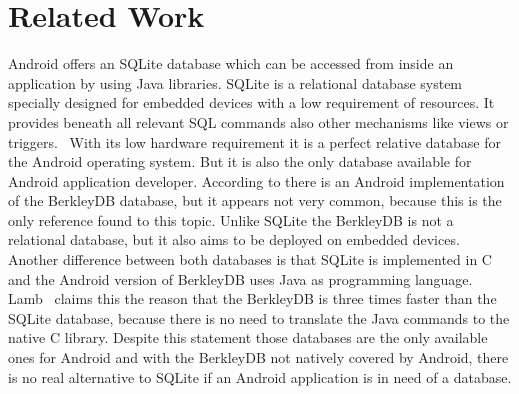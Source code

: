 \section{Related Work}
\label{sec:overview:related-work}
Android offers an SQLite database which can be accessed from inside an application by using Java libraries.
SQLite is a relational database system specially designed for embedded devices with a low requirement of resources.
It provides beneath all relevant SQL commands also other mechanisms like views or triggers.~\cite{owens2006definitive}
With its low hardware requirement it is a perfect relative database for the Android operating system.
But it is also the only database available for Android application developer.
According to \cite{lamb2010berkleydb} there is an Android implementation of the BerkleyDB database, but it appears not very common, because this is the only reference found to this topic.
Unlike SQLite the BerkleyDB is not a relational database, but it also aims to be deployed on embedded devices.
Another difference between both databases is that SQLite is implemented in C and the Android version of BerkleyDB uses Java as programming language.
Lamb~\cite{lamb2010berkleydb} claims this the reason that the BerkleyDB is three times faster than the SQLite database, because there is no need to translate the Java commands to the native C library.
Despite this statement those databases are the only available ones for Android and with the BerkleyDB not natively covered by Android, there is no real alternative to SQLite if an Android application is in need of a database.\\

